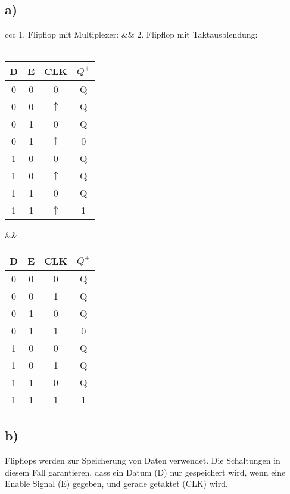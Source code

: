 \documentclass[a4paper]{scrartcl}
\begin{document}
    \subsection{a)}
    \begin{center}
	    \begin{tabular}{ccc}
  			1. Flipflop mit Multiplexer: &\quad\quad & 2. Flipflop mit Taktausblendung: \\ \\
	        \begin{tabular}{|c|c|c||c|}\hline
	            D & E & CLK & $Q^+$ \\ \hline
	            0 & 0 & 0 & Q \\
	            0 & 0 & $\uparrow$ & Q \\
	            0 & 1 & 0 & Q \\
	            0 & 1 & $\uparrow$ & 0 \\
	            1 & 0 & 0 & Q \\
	            1 & 0 & $\uparrow$ & Q \\
	            1 & 1 & 0 & Q \\
	            1 & 1 & $\uparrow$ & 1 \\ \hline
	        \end{tabular}
	       	&\quad\quad &
	        \begin{tabular}{|c|c|c||c|}\hline
	            D & E & CLK & $Q^+$ \\ \hline
	            0 & 0 & 0 & Q \\
	            0 & 0 & 1 & Q \\
	            0 & 1 & 0 & Q \\
	            0 & 1 & 1 & 0 \\
	            1 & 0 & 0 & Q \\
	            1 & 0 & 1 & Q \\
	            1 & 1 & 0 & Q \\
	            1 & 1 & 1 & 1 \\ \hline
	        \end{tabular}  
    	\end{tabular}
    \end{center}
    
	\newpage
    \subsection{b)}
        Flipflops werden zur Speicherung von Daten verwendet. Die Schaltungen in diesem Fall
        garantieren, dass ein Datum (D) nur gespeichert wird, wenn eine Enable Signal (E) gegeben,
        und gerade getaktet (CLK) wird.
\end{document}
